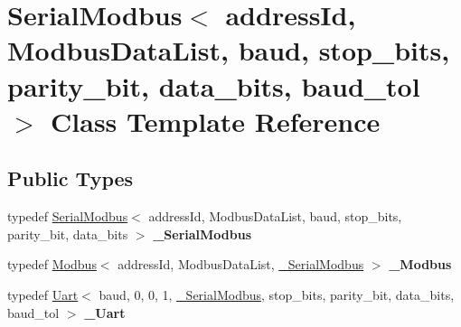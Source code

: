 \hypertarget{classSerialModbus}{}\section{Serial\+Modbus$<$ address\+Id, Modbus\+Data\+List, baud, stop\+\_\+bits, parity\+\_\+bit, data\+\_\+bits, baud\+\_\+tol $>$ Class Template Reference}
\label{classSerialModbus}
\subsection*{Public Types}
\begin{DoxyCompactItemize}
\item 
\hypertarget{classSerialModbus_a5bcd2b6c412dc9490c20fb74ed6f1c6f}{}\label{classSerialModbus_a5bcd2b6c412dc9490c20fb74ed6f1c6f} 
typedef \hyperlink{classSerialModbus}{Serial\+Modbus}$<$ address\+Id, Modbus\+Data\+List, baud, stop\+\_\+bits, parity\+\_\+bit, data\+\_\+bits $>$ {\bfseries \+\_\+\+Serial\+Modbus}
\item 
\hypertarget{classSerialModbus_a510d3c49df1125fd0de1d8a4b29418a9}{}\label{classSerialModbus_a510d3c49df1125fd0de1d8a4b29418a9} 
typedef \hyperlink{classModbus}{Modbus}$<$ address\+Id, Modbus\+Data\+List, \hyperlink{classSerialModbus}{\+\_\+\+Serial\+Modbus} $>$ {\bfseries \+\_\+\+Modbus}
\item 
\hypertarget{classSerialModbus_a1545c72d8a0138c4c4807427994037b6}{}\label{classSerialModbus_a1545c72d8a0138c4c4807427994037b6} 
typedef \hyperlink{classUart}{Uart}$<$ baud, 0, 0, 1, \hyperlink{classSerialModbus}{\+\_\+\+Serial\+Modbus}, stop\+\_\+bits, parity\+\_\+bit, data\+\_\+bits, baud\+\_\+tol $>$ {\bfseries \+\_\+\+Uart}
\end{DoxyCompactItemize}
